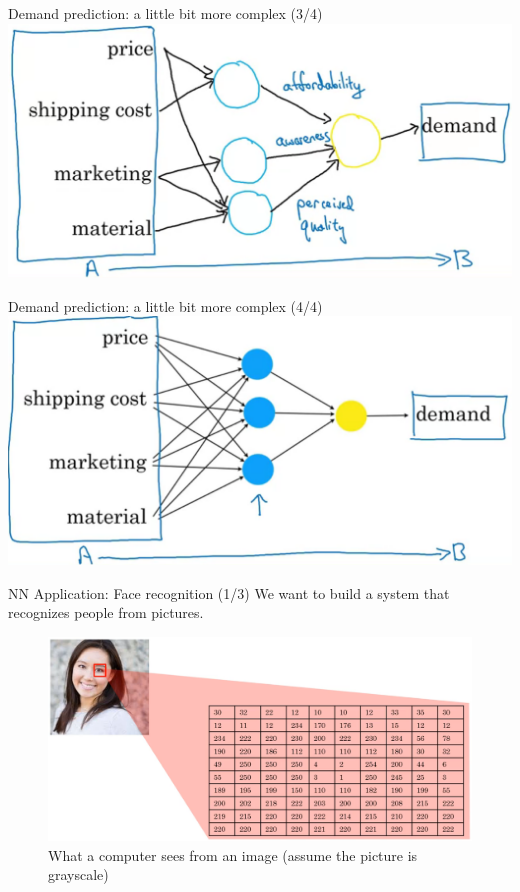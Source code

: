 \documentclass[pdf]{beamer}
\theoremstyle{mystyle}
\begin{document}
\begin{frame}{Demand prediction: a little bit more complex (3/4)}
	\centering
	\includegraphics[scale=.275]{demand-prediction-nn-2.png}
\end{frame}

\begin{frame}{Demand prediction: a little bit more complex (4/4)}
	\centering
	\includegraphics[scale=.275]{demand-prediction-nn-3.png}
\end{frame}


\begin{frame}{NN Application: Face recognition (1/3)}
	We want to build a system that recognizes people from pictures.
	\begin{figure}[!ht]
		\centering
		\includegraphics[scale=.25]{face-recognition-intro}
		\caption{What a computer sees from an image (assume the picture is grayscale)~\citep{ng2019AIForEveryone}}
	\end{figure}
	
\end{frame}
\end{document}
